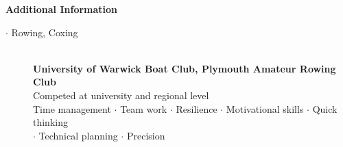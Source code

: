 \documentclass[12pt]{article}
\begin{document}
  \textbf{Additional Information}
    \begin{description}
      \item[$\cdot$ Rowing, Coxing] \textbf{\\University of Warwick Boat Club, Plymouth Amateur Rowing Club}
      \\ Competed at university and regional level \\
      Time management $\cdot$ Team work $\cdot$ Resilience $\cdot$ Motivational skills $\cdot$ Quick thinking \\ $\cdot$ Technical planning $\cdot$ Precision
      \iffalse
      The sport of rowing requires time commitement, hard work, and team work. Rowing demands reaching one's physical limit only to push past it, working together to achieve the best you can. Coxing teaches quick thinking, motivational skills, and technical planning.
      \fi
    \end{description}
\end{document}
